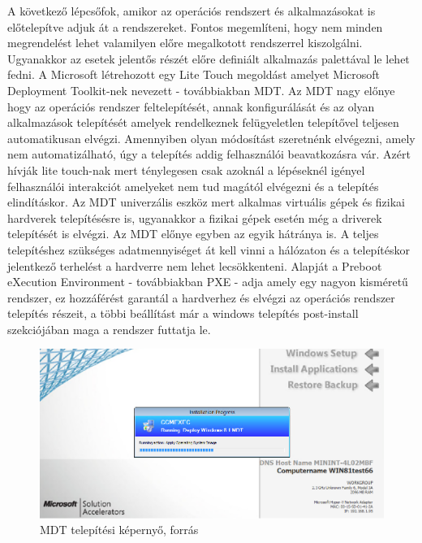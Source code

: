 \documentclass[12pt,oneside,justify,table]{book}
\begin{document}
A következő lépcsőfok, amikor az operációs rendszert és alkalmazásokat is előtelepítve adjuk át a rendszereket. Fontos megemlíteni, hogy nem minden megrendelést lehet valamilyen előre megalkotott rendszerrel kiszolgálni. Ugyanakkor az esetek jelentős részét előre definiált alkalmazás palettával le lehet fedni. A Microsoft létrehozott egy Lite Touch megoldást amelyet Microsoft Deployment Toolkit-nek nevezett - továbbiakban MDT. Az MDT nagy előnye hogy az operációs rendszer feltelepítését, annak konfigurálását és az olyan alkalmazások telepítését amelyek rendelkeznek felügyeletlen telepítővel teljesen automatikusan elvégzi. Amennyiben olyan módosítást szeretnénk elvégezni, amely nem automatizálható, úgy a telepítés addig felhasználói beavatkozásra vár. Azért hívják lite touch-nak mert ténylegesen csak azoknál a lépéseknél igényel felhasználói interakciót amelyeket nem tud magától elvégezni és a telepítés elindításkor. Az MDT univerzális eszköz mert alkalmas virtuális gépek és fizikai hardverek telepítésésre is, ugyanakkor a fizikai gépek esetén még a driverek telepítését is elvégzi. Az MDT előnye egyben az egyik hátránya is. A teljes telepítéshez szükséges adatmennyiséget át kell vinni a hálózaton és a telepítéskor jelentkező terhelést a hardverre nem lehet lecsökkenteni. Alapját a Preboot eXecution Environment - továbbiakban PXE - adja amely egy nagyon kisméretű rendszer, ez hozzáférést garantál a hardverhez és elvégzi az operációs rendszer telepítés részeit, a többi beállítást már a windows telepítés post-install szekciójában maga a rendszer futtatja le.  \\
\begin{figure}[h]
\centering
\includegraphics[width=1\textwidth]{mdt.png}
\caption{MDT telepítési képernyő, forrás \cite{MDTImage}}
\label{fig:mdt_image}
\end{figure}
\end{document}
